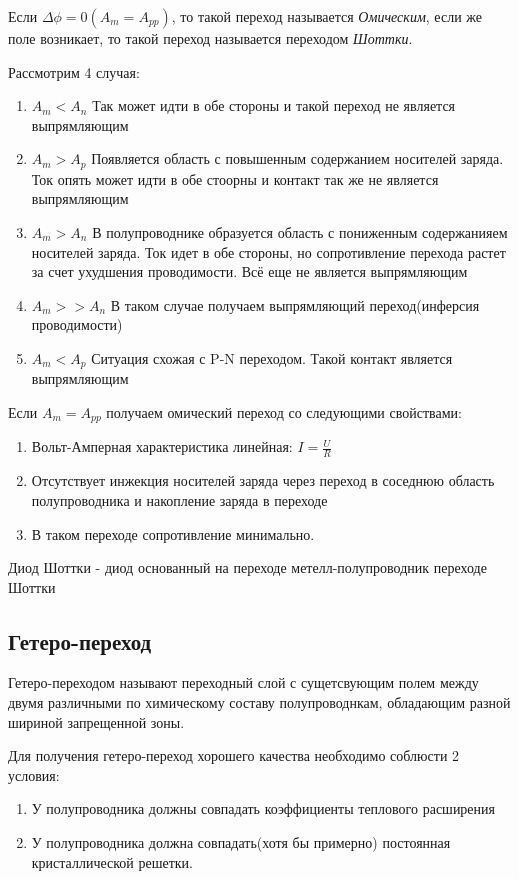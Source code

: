 \documentclass[../main.tex]{subfiles}
\begin{document}
 Если $\Delta \phi = 0 (A_m = A_{pp})$, то такой переход называется \textit{Омическим}, если же поле возникает, то такой переход называется
переходом \textit{Шоттки}.

Рассмотрим 4 случая:
\begin{enumerate}
    \item $A_m < A_n$
    Так может идти в обе стороны и такой переход не является выпрямляющим
    \item $A_m > A_p$
    Появляется область с повышенным содержанием носителей заряда. Ток опять может идти в обе стоорны и контакт так же не является выпрямляющим
    \item $A_m > A_n$
    В полупроводнике образуется область с пониженным содержанияем носителей заряда. Ток идет в обе стороны, но сопротивление перехода растет за счет ухудшения
    проводимости. Всё еще не является выпрямляющим
    \item $A_m >> A_n$
    В таком случае получаем выпрямляющий переход(инферсия проводимости)
    \item $A_m < A_p$
    Ситуация схожая с P-N переходом. Такой контакт является выпрямляющим
\end{enumerate}

Если $A_m = A_{pp}$ получаем омический переход со следующими свойствами:
\begin{enumerate}
    \item Вольт-Амперная характеристика линейная: $I = \frac{U}{R}$
    \item Отсутствует инжекция носителей заряда через переход в соседнюю область полупроводника и накопление заряда в переходе
    \item В таком переходе сопротивление минимально.
\end{enumerate}
 Диод Шоттки - диод основанный на переходе метелл-полупроводник переходе Шоттки

\subsection{Гетеро-переход}
 Гетеро-переходом называют переходный слой с сущетсвующим полем между двумя различными по химическому составу полупроводнкам,
обладающим разной шириной запрещенной зоны.

Для получения гетеро-переход хорошего качества необходимо соблюсти 2 условия:
\begin{enumerate}
    \item У полупроводника должны совпадать коэффициенты теплового расширения
    \item У полупроводника должна совпадать(хотя бы примерно) постоянная кристаллической решетки.
\end{enumerate}
\end{document}
